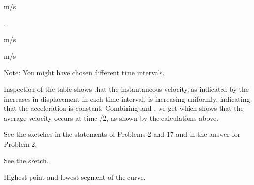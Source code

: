 {\BriefAns

\begin{two-digit-list}
\item [1.] \NullItem
\begin{one-digit-list}
\item [a.] \unit{m/s}
\item [  ] .
\item [  ] \unit{m/s}
\item [b.] \unit{m/s}
\item [  ] 
\item [  ] Note: You might have chosen different time intervals.
\item [c.] Inspection of the table shows that the instantaneous velocity, as
           indicated by the increases in displacement in each time interval, is
           increasing uniformly, indicating that the acceleration is constant.
           Combining  and , we get
            which shows that the average velocity occurs at
           time /2, as shown by the calculations above.
\item [d.] See the sketches in the statements of Problems 2 and 17 and in the answer for Problem 2.
\end{one-digit-list}

\item [2.] \NullItem
\begin{one-digit-list}
\item [a.] See the sketch.
\item [b.] Highest point and lowest segment of the curve.
\end{one-digit-list}


\end{two-digit-list}}
